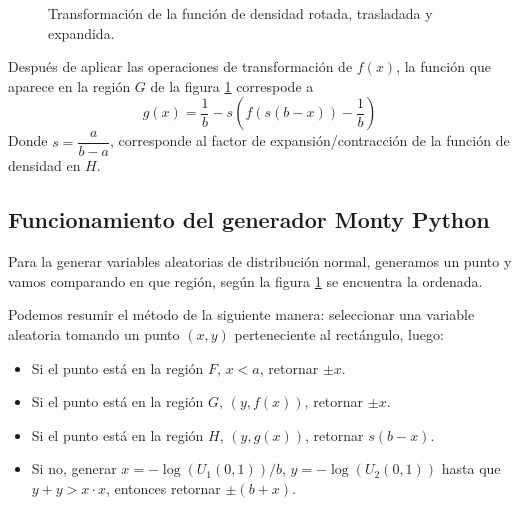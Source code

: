 \begin{figure}[ht!]
    \caption{Transformación de la función de densidad rotada, trasladada y expandida.}
    \label{fig:f-expandida}
\end{figure}
% 
Después de aplicar
las operaciones de transformación de $f(x)$, la función que aparece en la región $G$ de la figura \ref{fig:f-expandida} correspode a
\begin{equation}
    g(x) = \frac{1}{b} - s\left(f(s(b-x)) - \frac{1}{b}\right)
\end{equation}
Donde $s = \dfrac{a}{b-a}$, corresponde al factor de expansión/contracción de la función de densidad en $H$.
% 
\subsection{Funcionamiento del generador Monty Python}
Para la generar variables aleatorias de distribución normal, generamos un punto
y vamos comparando en que región, según la figura \ref{fig:f-expandida} se encuentra la ordenada.

Podemos resumir el método de la siguiente manera: seleccionar una variable aleatoria tomando un punto $(x,y)$ perteneciente al rectángulo, luego:
\begin{itemize}
    \item Si el punto está en la región $F, \, x<a$, retornar $\pm x$.
    \item Si el punto está en la región $G, \, (y, f( x))$, retornar $\pm x$.
    \item Si el punto está en la región $H, \, (y, g( x))$, retornar $s(b-x)$.
    \item Si no, generar $x =- \log(U_1(0,1))/b$, $y =  - \log(U_2(0,1))$
          hasta que $y+y > x\cdot x$, entonces retornar $\pm(b+x)$.
\end{itemize}
\clearpage

